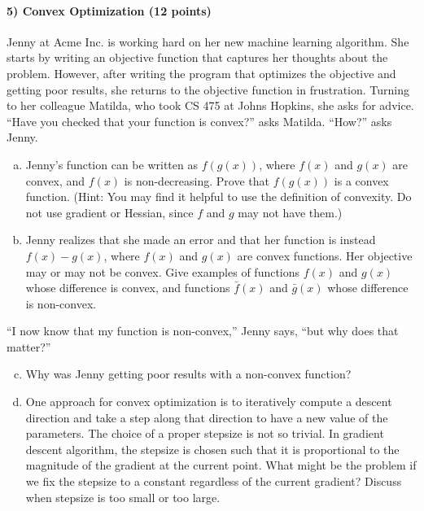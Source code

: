 \documentclass[11pt]{article}
\begin{document}
\paragraph{5) Convex Optimization (12 points)}
Jenny at Acme Inc. is working hard on her new machine learning algorithm. She starts by writing an objective function
that captures her thoughts about the problem. However, after writing the program that optimizes the objective
and getting poor results, she returns to the objective function in frustration. Turning to her colleague Matilda,
who took CS 475 at Johns Hopkins, she asks for advice. ``Have you checked that your function is convex?'' asks Matilda.
``How?'' asks Jenny.
\begin{enumerate}[(a)]
\item Jenny's function can be written as $f(g(x))$, where $f(x)$ and $g(x)$ are convex, and $f(x)$ is non-decreasing. Prove that $f(g(x))$ is a convex function. (Hint: You may find it helpful to use the definition of convexity. Do not use gradient or Hessian, since $f$ and $g$ may not have them.)
\item Jenny realizes that she made an error and that her function is instead
$f(x)-g(x)$, where $f(x)$ and $g(x)$ are convex functions. Her objective may or may not be convex. Give examples of functions $f(x)$ and $g(x)$ whose difference is convex, and functions $\bar{f}(x)$ and $\bar{g}(x)$ whose difference is non-convex.
\end{enumerate}
``I now know that my function is non-convex,'' Jenny says, ``but why does that matter?''
\begin{enumerate}[(a)]
\setcounter{enumi}{2}
\item Why was Jenny getting poor results with a non-convex function?
\item One approach for convex optimization is to iteratively compute a descent direction and take a step along that direction to have a new value of the parameters. The choice of a proper stepsize is not so trivial. In gradient descent algorithm, the stepsize is chosen such that it is proportional to the magnitude of the gradient at the current point. What might be the problem if we fix the stepsize to a constant regardless of the current gradient? Discuss when stepsize is too small or too large.
\end{enumerate}
\end{document}
